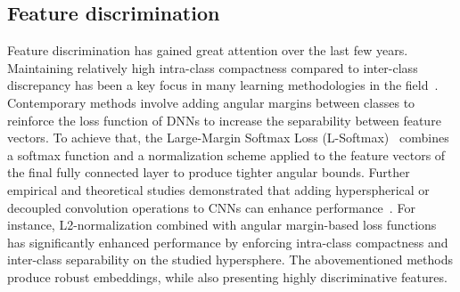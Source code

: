 \subsection{Feature discrimination}
Feature discrimination has gained great attention over the last few years.
Maintaining relatively high intra-class compactness compared to inter-class discrepancy has been a key focus in many learning methodologies in the field~\cite{sun2014deep, wen2016discriminative, adeli2018semi}.
Contemporary methods involve adding angular margins between classes to reinforce the loss function of DNNs to increase the separability between feature vectors. 
To achieve that, the Large-Margin Softmax Loss (L-Softmax)~\cite{liu2016large} combines a softmax function and a normalization scheme applied to the feature vectors of the final fully connected layer to produce tighter angular bounds.
Further empirical and theoretical studies demonstrated that adding hyperspherical or decoupled convolution operations to CNNs can enhance performance~\cite{liu2017deep}. 
For instance, L2-normalization combined with angular margin-based loss functions~\cite{deng2019arcface,liu2017sphereface} has significantly enhanced performance by enforcing intra-class compactness and inter-class separability on the studied hypersphere.
The abovementioned methods produce robust embeddings, while also presenting highly discriminative features.